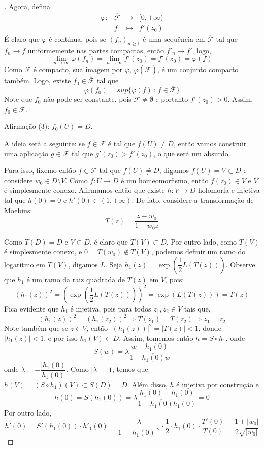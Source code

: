 \begin{proof}[]
Agora, defina $$\begin{array}{cccc}\varphi\colon & \overline{\mathcal{F}} & \longrightarrow & [0,+\infty) \\ & f & \longmapsto & f'(z_0)\end{array}$$ É claro que $\varphi$ é contínua, pois se $(f_n)_{n\geq 1}$ é uma sequência em $\overline{\mathcal{F}}$ tal que $f_n\longrightarrow f$ uniformemente nas partes compactas, então $f'_n\longrightarrow f'$, logo, $$\displaystyle\lim_{n\to\infty}\varphi(f_n) = \displaystyle\lim_{n\to\infty}f'(z_0) = f'(z_0) = \varphi(f)$$ Como $\overline{\mathcal{F}}$ é compacto, sua imagem por $\varphi$, $\varphi(\overline{\mathcal{F}})$, é um conjunto compacto também. Logo, existe $f_0\in\overline{\mathcal{F}}$ tal que $$\varphi(f_0) = sup{\{\varphi(f)\,:\,f\in\overline{\mathcal{F}}\}}$$ Note que $f_0$ não pode ser constante, pois $\mathcal{F}\neq\emptyset$ e portanto $f'(z_0)>0$. Assim, $f_0\in\mathcal{F}$.

Afirmação (3): $f_0(U)=D$.

A ideia será a seguinte: se $f\in\mathcal{F}$ é tal que $f(U)\neq D$, então vamos construir uma aplicação $g\in\mathcal{F}$ tal que $g'(z_0)>f'(z_0)$, o que será um absurdo.

Para isso, fixemo então $f\in\mathcal{F}$ tal que $f(U)\neq D$, digamos $f(U)=V\subset D$ e considere $w_0\in D\setminus V$. Como $f\colon U\longrightarrow D$ é um homeomorfismo, então $f(z_0)\in V$ e $V$ é simplesmente conexo. Afirmamos então que existe $h\colon V\longrightarrow D$ holomorfa e injetiva tal que $h(0) = 0$ e $h'(0)\in(1,+\infty)$. De fato, considere a transformação de Moebius: $$T(z)=\dfrac{z-w_0}{1-\overline{w_0}z}$$

Como $T(D) = D$ e $V\subset D$, é claro que $T(V)\subset D$. Por outro lado, como $T(V)$ é simplesmente conexo, e $0 = T(w_0)\notin T(V)$, podemos definir um ramo do logaritmo em $T(V)$, digamos $L$. Seja $h_1(z) = \exp{\left(\dfrac{1}{2}L(T(z))\right)}$. Observe que $h_1$ é um ramo da raiz quadrada de $T(z)$ em $V$, pois: $$(h_1(z))^2 = \left(\exp{\left(\dfrac{1}{2}L(T(z))\right)}\right)^2 = \exp{(L(T(z)))} = T(z)$$ Fica evidente que $h_1$ é injetiva, pois para todos $z_1,z_2\in V$ tais que, $$(h_1(z))^2 = (h_1(z_2))^2\Longrightarrow T(z_1)=T(z_2)\Longrightarrow z_1=z_2$$
Note também que se $z\in V$, então $|(h_1(z))|^2 = |T(z)| < 1 $, donde $|h_1(z)|<1$, e por isso $h_1(V)\subset D$. Assim, tomemos então $h=S\circ h_1$, onde $$S(w) = \lambda\dfrac{w-h_1(0)}{1-\overline{h_1(0)}w}$$ onde $\lambda=-\dfrac{|h_1(0)}{h_1(0)}$. Como $|\lambda| = 1$, temos que $h(V) = (S\circ h_1)(V)\subset S(D) = D$. Além disso, $h$ é injetiva por construção e $$h(0) = S(h_1(0)) = \lambda\dfrac{h_1(0)-h_1(0)}{1-\overline{h_1(0)}h_1(0)} = 0$$ Por outro lado, $$h'(0) = S'(h_1(0))\cdot h'_1(0) = \dfrac{\lambda}{1-|h_1(0)|^2}\cdot\dfrac{1}{2}\cdot h_1(0)\cdot\dfrac{T'(0)}{T(0)} = \dfrac{1+|w_0|}{2\sqrt{|w_0|}}$$


\end{proof}

